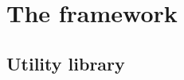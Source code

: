 \documentclass[british,10pt]{beamer}
\begin{document}
%


\section{The framework}

\subsection{Utility library}
\end{document}
